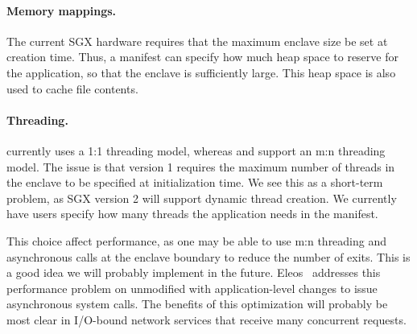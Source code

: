 \paragraph{Memory mappings.}
The current SGX hardware requires that the maximum enclave size 
be set at creation time.
Thus, 
a \graphenesgx{} manifest can specify how much heap space to reserve for the application,
so that the enclave is sufficiently large.
This heap space is also used to cache file contents.


\paragraph{Threading.}
\graphenesgx{} currently uses a 1:1 threading model,
whereas \scone{} and \panoply{} support an m:n threading model.
The issue is that \sgx{} version 1 requires the maximum number of threads in the enclave
to be specified at initialization time.
We see this as a short-term problem, as SGX version 2 will support dynamic thread creation.
We currently have users specify how many threads the application needs in the manifest.

This choice affect performance, as one may be able to use m:n threading and asynchronous calls at the enclave boundary
to reduce the number of exits.
This is a good idea we will probably implement in the future.
Eleos~\cite{orenbach17eleos} addresses this performance problem on unmodified \graphenesgx{} with 
application-level changes to issue asynchronous system calls.
The benefits of this %
optimization will probably be most clear in I/O-bound network services that receive many concurrent requests.



